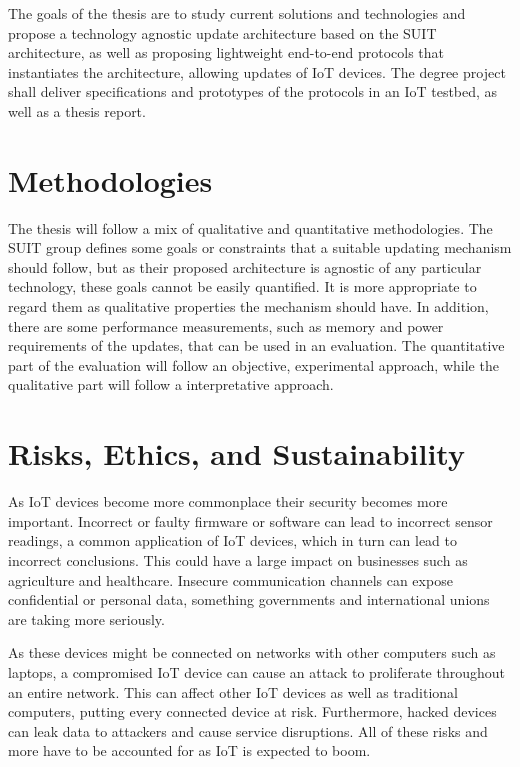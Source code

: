 \documentclass[0-thesis.tex]{subfiles}
\begin{document}
The goals of the thesis are to study current solutions and technologies and propose a
technology agnostic update architecture based on the SUIT architecture, as well as
proposing lightweight end-to-end protocols that instantiates the architecture, allowing
updates of IoT devices. The degree project shall deliver specifications and prototypes of
the protocols in an IoT testbed, as well as a thesis report.

\section{Methodologies}
\label{sec:methodologies}
The thesis will follow a mix of qualitative and quantitative methodologies. The SUIT group
defines some goals or constraints that a suitable updating mechanism should follow, but as
their proposed architecture is agnostic of any particular technology, these goals cannot
be easily quantified. It is more appropriate to regard them as qualitative properties the
mechanism should have. In addition, there are some performance measurements, such as
memory and power requirements of the updates, that can be used in an evaluation. The
quantitative part of the evaluation will follow an objective, experimental approach, while
the qualitative part will follow a interpretative approach.

\section{Risks, Ethics, and Sustainability}
\label{sec:risks-ethics-sustainability}
As IoT devices become more commonplace their security becomes more important. Incorrect or
faulty firmware or software can lead to incorrect sensor readings, a common application of
IoT devices, which in turn can lead to incorrect conclusions. This could have a large
impact on businesses such as agriculture and healthcare. Insecure communication channels
can expose confidential or personal data, something governments and international unions
are taking more seriously. 

As these devices might be connected on networks with other computers such as laptops, a
compromised IoT device can cause an attack to proliferate throughout an entire network.
This can affect other IoT devices as well as traditional computers, putting every
connected device at risk. Furthermore, hacked devices can leak data to attackers and cause
service disruptions. All of these risks and more have to be accounted for as IoT is
expected to boom.
\end{document}
